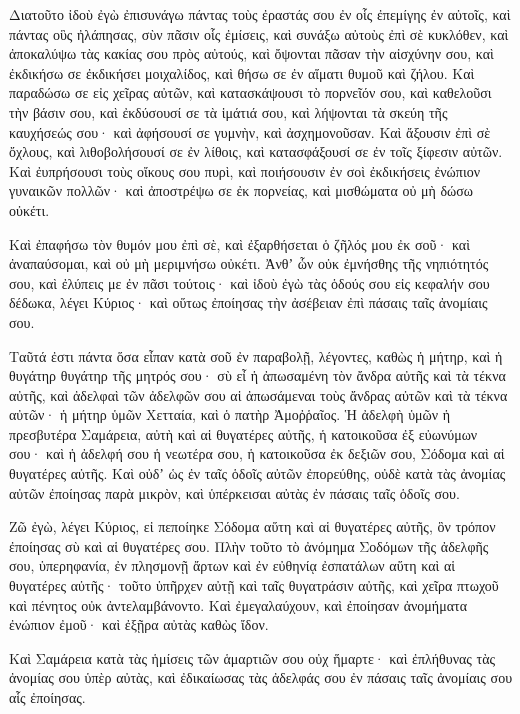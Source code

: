 {Διατοῦτο ἰδοὺ ἐγὼ ἐπισυνάγω πάντας τοὺς ἐραστάς σου ἐν οἷς ἐπεμίγης ἐν αὐτοῖς, καὶ πάντας οὓς ἠλάπησας, σὺν πᾶσιν οἷς ἐμίσεις, καὶ συνάξω αὐτοὺς ἐπὶ σὲ κυκλόθεν, καὶ ἀποκαλύψω τὰς κακίας σου πρὸς αὐτούς, καὶ ὄψονται πᾶσαν τὴν αἰσχύνην σου,
καὶ ἐκδικήσω σε ἐκδικήσει μοιχαλίδος, καὶ θήσω σε ἐν αἵματι θυμοῦ καὶ ζήλου.
Καὶ παραδώσω σε εἰς χεῖρας αὐτῶν, καὶ κατασκάψουσι τὸ πορνεῖόν σου, καὶ καθελοῦσι τὴν βάσιν σου, καὶ ἐκδύσουσί σε τὰ ἱμάτιά σου, καὶ λήψονται τὰ σκεύη τῆς καυχήσεώς σου· καὶ ἀφήσουσί σε γυμνὴν, καὶ ἀσχημονοῦσαν.
Καὶ ἄξουσιν ἐπὶ σὲ ὄχλους, καὶ λιθοβολήσουσί σε ἐν λίθοις, καὶ κατασφάξουσί σε ἐν τοῖς ξίφεσιν αὐτῶν.
Καὶ ἐυπρήσουσι τοὺς οἴκους σου πυρὶ, καὶ ποιήσουσιν ἐν σοὶ ἐκδικήσεις ἐνώπιον γυναικῶν πολλῶν· καὶ ἀποστρέψω σε ἐκ πορνείας, καὶ μισθώματα οὐ μὴ δώσω οὐκέτι.
\par }{\PP {}Καὶ ἐπαφήσω τὸν θυμόν μου ἐπὶ σὲ, καὶ ἐξαρθήσεται ὁ ζῆλός μου ἐκ σοῦ· καὶ ἀναπαύσομαι, καὶ οὐ μὴ μεριμνήσω οὐκέτι.
Ἀνθʼ ὧν οὐκ ἐμνήσθης τῆς νηπιότητός σου, καὶ ἐλύπεις με ἐν πᾶσι τούτοις· καὶ ἰδοὺ ἐγὼ τὰς ὁδούς σου εἰς κεφαλήν σου δέδωκα, λέγει Κύριος· καὶ οὕτως ἐποίησας τὴν ἀσέβειαν ἐπὶ πάσαις ταῖς ἀνομίαις σου.
\par }{\PP {}Ταῦτά ἐστι πάντα ὅσα εἶπαν κατὰ σοῦ ἐν παραβολῇ, λέγοντες, καθὼς ἡ μήτηρ,
καὶ ἡ θυγάτηρ θυγάτηρ τῆς μητρός σου· σὺ εἶ ἡ ἀπωσαμένη τὸν ἄνδρα αὐτῆς καὶ τὰ τέκνα αὐτῆς, καὶ ἀδελφαὶ τῶν ἀδελφῶν σου αἱ ἀπωσάμεναι τοὺς ἄνδρας αὐτῶν καὶ τὰ τέκνα αὐτῶν· ἡ μήτηρ ὑμῶν Χετταία, καὶ ὁ πατὴρ Ἀμοῤῥαῖος.
Ἡ ἀδελφὴ ὑμῶν ἡ πρεσβυτέρα Σαμάρεια, αὐτὴ καὶ αἱ θυγατέρες αὐτῆς, ἡ κατοικοῦσα ἐξ εὐωνύμων σου· καὶ ἡ ἀδελφή σου ἡ νεωτέρα σου, ἡ κατοικοῦσα ἐκ δεξιῶν σου, Σόδομα καὶ αἱ θυγατέρες αὐτῆς.
Καὶ οὐδʼ ὡς ἐν ταῖς ὁδοῖς αὐτῶν ἐπορεύθης, οὐδὲ κατὰ τὰς ἀνομίας αὐτῶν ἐποίησας παρὰ μικρὸν, καὶ ὑπέρκεισαι αὐτὰς ἐν πάσαις ταῖς ὁδοῖς σου.
\par }{\PP {}Ζῶ ἐγὼ, λέγει Κύριος, εἰ πεποίηκε Σόδομα αὕτη καὶ αἱ θυγατέρες αὐτῆς, ὃν τρόπον ἐποίησας σὺ καὶ αἱ θυγατέρες σου.
Πλὴν τοῦτο τὸ ἀνόμημα Σοδόμων τῆς ἀδελφῆς σου, ὑπερηφανία, ἐν πλησμονῇ ἄρτων καὶ ἐν εὐθηνίᾳ ἐσπατάλων αὕτη καὶ αἱ θυγατέρες αὐτῆς· τοῦτο ὑπῆρχεν αὐτῇ καὶ ταῖς θυγατράσιν αὐτῆς, καὶ χεῖρα πτωχοῦ καὶ πένητος οὐκ ἀντελαμβάνοντο.
Καὶ ἐμεγαλαύχουν, καὶ ἐποίησαν ἀνομήματα ἐνώπιον ἐμοῦ· καὶ ἐξῇρα αὐτὰς καθὼς ἴδον.
\par }{\PP {}Καὶ Σαμάρεια κατὰ τὰς ἡμίσεις τῶν ἁμαρτιῶν σου οὐχ ἥμαρτε· καὶ ἐπλήθυνας τὰς ἀνομίας σου ὑπὲρ αὐτὰς, καὶ ἐδικαίωσας τὰς ἀδελφάς σου ἐν πάσαις ταῖς ἀνομίαις σου αἷς ἐποίησας.
}
